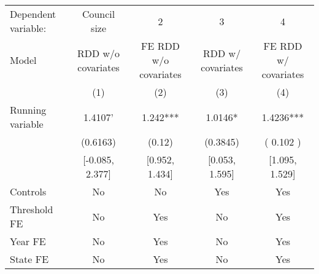 \begin{tabular}{lcccc}
  \toprule
 \midrule
Dependent variable: & Council size & 2 & 3 & 4 \\ 
 Model & RDD w/o covariates & FE RDD w/o covariates & RDD w/ covariates & FE RDD w/ covariates \\ 
   & (1) & (2) & (3) & (4) \\ 
   \midrule
Running variable & 1.4107' & 1.242*** & 1.0146* & 1.4236*** \\ 
   & (0.6163) & (0.12) & (0.3845) & ( 0.102 ) \\ 
   & [-0.085, 2.377] & [0.952, 1.434] & [0.053, 1.595] & [1.095, 1.529] \\ 
   \midrule
Controls & No & No & Yes & Yes \\ 
  Threshold FE & No & Yes & No & Yes \\ 
  Year FE & No & Yes & No & Yes \\ 
  State FE & No & Yes & No & Yes \\ 
   \midrule
 \bottomrule
\end{tabular}
